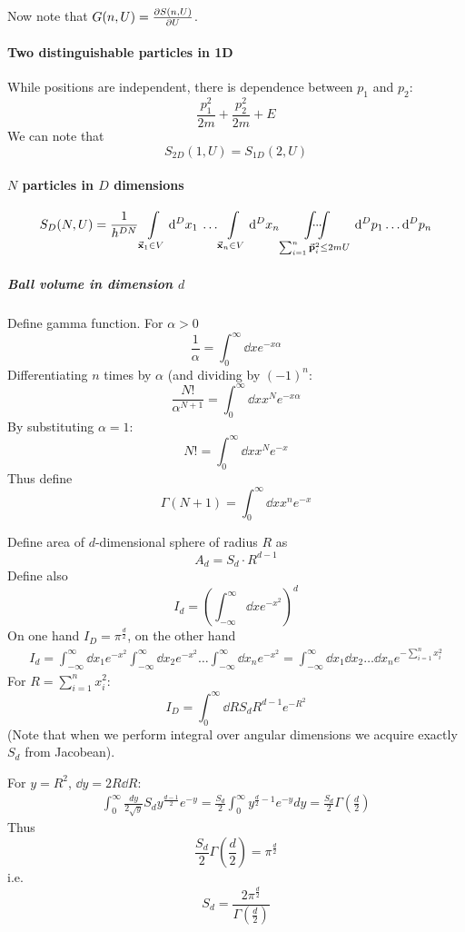 Now note that $G(n, U) = \pdv{S(n,U)}{U}$.

\paragraph{Two distinguishable particles in 1D}

While positions are independent, there is dependence between $p_1$ and $p_2$:
$$\frac{p_1^2}{2m}+\frac{p_2^2}{2m} + E$$
We can note that
$$S_{2D}(1,U) = S_{1D} (2, U)$$

\paragraph{$N$ particles in $D$ dimensions}
\begin{align}S_D(N,U) = \frac{1}{h^{DN}} \int\limits_{\va{x}_1 \in V} \dd[D]{x_1} \: \dots  \int\limits_{\va{x}_n \in V} \dd[D]{x_n}  \idotsint\limits_{\sum_{i=1}^n \va{p}_i^2 \leq 2mU} \dd[D]{p_1} \dots \dd[D]{p_n}\end{align}

\subparagraph{Ball volume in dimension $d$}
Define gamma function. For $\alpha > 0$
$$\frac{1}{\alpha} = \int_0^\infty \dd{x} e^{-x\alpha}$$
Differentiating $n$ times by $\alpha$ (and dividing by $(-1)^n$:
$$\frac{N!}{\alpha^{N+1}} = \int_0^\infty \dd{x} x^N e^{-x\alpha}$$
By substituting $\alpha = 1$:
$$N! = \int_0^\infty \dd{x} x^N e^{-x}$$
Thus define 
$$\Gamma(N+1) = \int_0^\infty \dd{x} x^n e^{-x}$$

Define area of $d$-dimensional sphere of radius $R$ as
$$A_d = S_d \cdot R^{d-1}$$
Define also
$$I_d = \left(\int_{-\infty}^{\infty} \dd{x} e^{-x^2}\right)^d$$
On one hand $I_D = \pi^{\frac{d}{2}}$, on the other hand
\begin{align}
I_d = \int_{-\infty}^{\infty} \dd{x_1}  e^{-x^2} \int_{-\infty}^{\infty} \dd{x_2}  e^{-x^2} \dots \int_{-\infty}^{\infty} \dd{x_n}  e^{-x^2} = \int_{-\infty}^{\infty} \dd{x_1}\dd{x_2}\dots \dd{x_n}   e^{-\sum_{i=1}^n x_i^2}
\end{align}
For $R=\sum_{i=1}^n x_i^2$:
$$I_D = \int_0^\infty \dd{R} S_d R^{d-1} e^{-R^2}$$
(Note that when we perform integral over angular dimensions we acquire exactly $S_d$ from Jacobean).

For $y=R^2$, $\dd{y}=2R\dd{R}$:
\begin{align*}
\int_0^\infty \frac{dy}{2\sqrt{y}} S_d y^{\frac{d-1}{2}} e^{-y} = \frac{S_d}{2} \int_{0}^{\infty} y^{\frac{d}{2} -1} e^{-y} dy = \frac{S_d}{2} \Gamma\left(\frac{d}{2}\right)
\end{align*}
Thus
$$\frac{S_d}{2} \Gamma\left(\frac{d}{2}\right) = \pi^{\frac{d}{2}} $$
i.e.\
$$S_d = \frac{2\pi^{\frac{d}{2}}}{\Gamma\left(\frac{d}{2}\right)}$$

